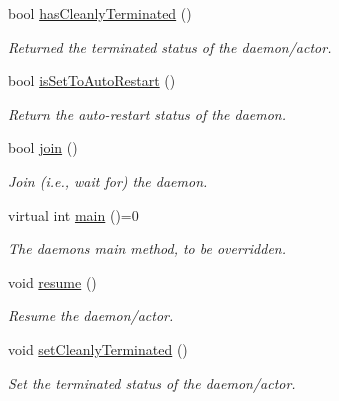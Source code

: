 \begin{DoxyCompactItemize}
\mbox{\label{classwrench_1_1_s4_u___daemon_a08677e6eb04b469dfa98357212b57930}} 
bool \hyperlink{classwrench_1_1_s4_u___daemon_a08677e6eb04b469dfa98357212b57930}{has\+Cleanly\+Terminated} ()
\begin{DoxyCompactList}\small\item\em Returned the terminated status of the daemon/actor. \end{DoxyCompactList}\item 
bool \hyperlink{classwrench_1_1_s4_u___daemon_ab500c3fa5bba4bdad7f03def7c6f453a}{is\+Set\+To\+Auto\+Restart} ()
\begin{DoxyCompactList}\small\item\em Return the auto-\/restart status of the daemon. \end{DoxyCompactList}\item 
bool \hyperlink{classwrench_1_1_s4_u___daemon_a0c9fe3246728f52e4d5ae8b1fe9c500f}{join} ()
\begin{DoxyCompactList}\small\item\em Join (i.\+e., wait for) the daemon. \end{DoxyCompactList}\item 
virtual int \hyperlink{classwrench_1_1_s4_u___daemon_a0073b1104849679756809330533400eb}{main} ()=0
\begin{DoxyCompactList}\small\item\em The daemon\textquotesingle{}s main method, to be overridden. \end{DoxyCompactList}\item 
\mbox{\label{classwrench_1_1_s4_u___daemon_ad070bf88da75e7c87df0e08dbbb2ed72}} 
void \hyperlink{classwrench_1_1_s4_u___daemon_ad070bf88da75e7c87df0e08dbbb2ed72}{resume} ()
\begin{DoxyCompactList}\small\item\em Resume the daemon/actor. \end{DoxyCompactList}\item 
\mbox{\label{classwrench_1_1_s4_u___daemon_acea78f7f12fe751f5e4cf31654be75e4}} 
void \hyperlink{classwrench_1_1_s4_u___daemon_acea78f7f12fe751f5e4cf31654be75e4}{set\+Cleanly\+Terminated} ()
\begin{DoxyCompactList}\small\item\em Set the terminated status of the daemon/actor. \end{DoxyCompactList}\item 

\end{DoxyCompactItemize}
